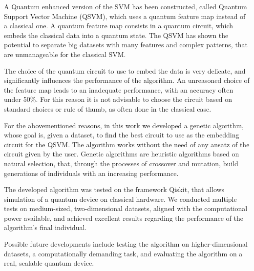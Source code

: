 \documentclass{article}
\begin{document}
A Quantum enhanced version of the SVM has been constructed, called Quantum Support Vector Machine (QSVM), which uses a quantum feature map instead of a classical one. A quantum feature map consists in a quantum circuit, which embeds the classical data into a quantum state. The QSVM has shown the potential to separate big datasets with many features and complex patterns, that are unmanageable for the classical SVM.

The choice of the quantum circuit to use to embed the data is very delicate, and significantly influences the performance of the algorithm. An unreasoned choice of the feature map leads to an inadequate performance, with an accuracy often under 50\%. For this reason it is not advisable to choose the circuit based on standard choices or rule of thumb, as often done in the classical case.  

For the abovementioned reasons, in this work we developed a genetic algorithm, whose goal is, given a dataset, to find the best circuit to use as the embedding circuit for the QSVM. The algorithm works without the need of any ansatz of the circuit given by the user. Genetic algorithms are heuristic algorithms based on natural selection, that, through the processes of crossover and mutation, build generations of individuals with an increasing performance.

The developed algorithm was tested on the framework Qiskit, that allows simulation of a quantum device on classical hardware. We conducted multiple tests on medium-sized, two-dimensional datasets, aligned with the computational power available, and achieved excellent results regarding the performance of the algorithm's final individual.

Possible future developments include testing the algorithm on higher-dimensional datasets, a computationally demanding task, and evaluating the algorithm on a real, scalable quantum device.
\end{document}
